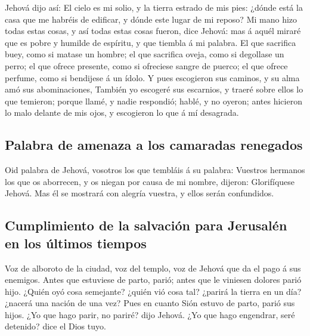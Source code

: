 Jehová dijo así: El cielo es mi solio, y la tierra estrado
de mis pies: ¿dónde está la casa que me habréis de edificar, y dónde
este lugar de mi reposo?  Mi mano hizo todas estas cosas, y
así todas estas cosas fueron, dice Jehová: mas á aquél miraré que es
pobre y humilde de espíritu, y que tiembla á mi palabra.  El
que sacrifica buey, como si matase un hombre; el que sacrifica oveja,
como si degollase un perro; el que ofrece presente, como si ofreciese
sangre de puerco; el que ofrece perfume, como si bendijese á un ídolo. Y
pues escogieron sus caminos, y su alma amó sus abominaciones,
 También yo escogeré sus escarnios, y traeré sobre ellos lo
que temieron; porque llamé, y nadie respondió; hablé, y no oyeron; antes
hicieron lo malo delante de mis ojos, y escogieron lo que á mí
desagrada.

\hypertarget{palabra-de-amenaza-a-los-camaradas-renegados}{%
\subsection{Palabra de amenaza a los camaradas
renegados}\label{palabra-de-amenaza-a-los-camaradas-renegados}}

 Oid palabra de Jehová, vosotros los que tembláis á su
palabra: Vuestros hermanos los que os aborrecen, y os niegan por causa
de mi nombre, dijeron: Glorifíquese Jehová. Mas él se mostrará con
alegría vuestra, y ellos serán confundidos.

\hypertarget{cumplimiento-de-la-salvaciuxf3n-para-jerusaluxe9n-en-los-uxfaltimos-tiempos}{%
\subsection{Cumplimiento de la salvación para Jerusalén en los últimos
tiempos}\label{cumplimiento-de-la-salvaciuxf3n-para-jerusaluxe9n-en-los-uxfaltimos-tiempos}}

 Voz de alboroto de la ciudad, voz del templo, voz de Jehová
que da el pago á sus enemigos.  Antes que estuviese de
parto, parió; antes que le viniesen dolores parió hijo. 
¿Quién oyó cosa semejante? ¿quién vió cosa tal? ¿parirá la tierra en un
día? ¿nacerá una nación de una vez? Pues en cuanto Sión estuvo de parto,
parió sus hijos.  ¿Yo que hago parir, no pariré? dijo
Jehová. ¿Yo que hago engendrar, seré detenido? dice el Dios tuyo.

